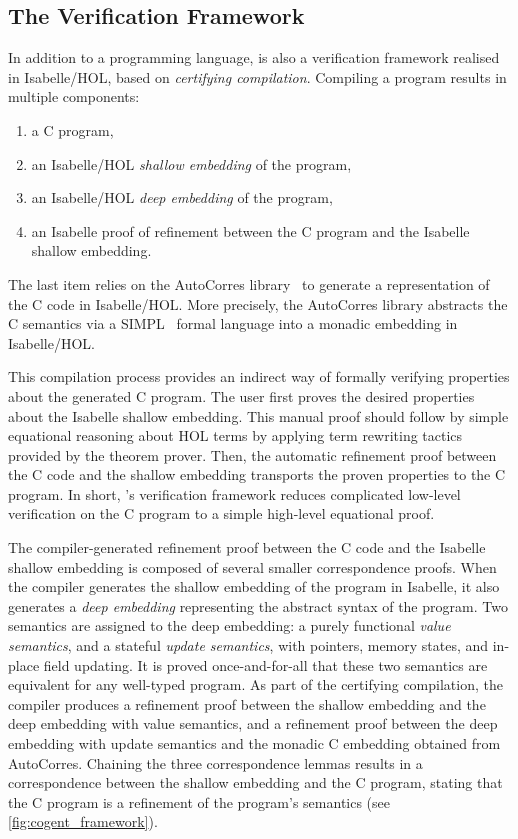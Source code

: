 \subsection{The Verification Framework}
{\label{ssec:cogent-verification}}

In addition to a programming language, \Cogent is also a verification framework
realised in Isabelle/HOL, based on \emph{certifying compilation}.
Compiling a \cogent program results in multiple components:
\begin{enumerate}
  \item a C program,
  \item an Isabelle/HOL \emph{shallow embedding}   of the \cogent program,
  \item an Isabelle/HOL \emph{deep embedding}   of the \cogent program,
  \item an Isabelle proof of refinement between the C
      program and the Isabelle shallow embedding.
\end{enumerate}
The last item relies on the AutoCorres library~\citep{autocorres} to generate 
a representation of the C code in Isabelle/HOL. More precisely, the AutoCorres library 
abstracts the C semantics via a SIMPL~\citep{simpl} formal language into
a monadic embedding in Isabelle/HOL.

This compilation process provides an indirect way of formally verifying
properties about the generated C program. The user first proves
the desired properties about the Isabelle shallow
embedding.  This manual proof should follow by simple equational reasoning about HOL terms by applying term rewriting
tactics provided by the theorem prover. Then, the automatic refinement
proof between the C code and the shallow embedding transports the proven
properties to the C program. In short, \cogent's verification
framework reduces complicated low-level verification on the C program to
a simple high-level equational proof.

The compiler-generated refinement proof between the C code and the
Isabelle shallow embedding is composed of several smaller
correspondence proofs.  When the compiler generates the shallow
embedding of the \cogent program in Isabelle, it also generates a
\emph{deep embedding} representing the abstract syntax of the \cogent
program. Two semantics are assigned to the deep embedding: a purely
functional \emph{value semantics}, and a stateful \emph{update
  semantics}, with pointers, memory states, and in-place field updating.
It is proved once-and-for-all that these two semantics are equivalent for
any well-typed \cogent program. As part of the certifying compilation,
the compiler produces a refinement proof between the shallow embedding
and the deep embedding with value semantics, and a refinement proof
between the deep embedding with update semantics and the monadic C
embedding obtained from AutoCorres. Chaining the three correspondence
lemmas results in a correspondence between
the shallow embedding and the C program, stating that the C program is a
refinement of the \cogent program's semantics (see \autoref{fig:cogent_framework}).

